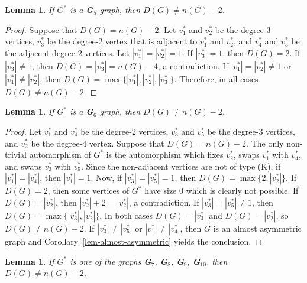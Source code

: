 \documentclass[12pt]{article}
\newtheorem{lemma}[theorem]{Lemma}
\begin{document}
\begin{lemma}\label{G5}
If $G^{\ast}$ is a {\bf G}$_5$ graph, 
then $D(G)\neq n(G)-2$.
\end{lemma}

\begin{proof}
Suppose that $D(G)= n(G)-2$.
Let $v^{\ast}_1$ and $v^{\ast}_2$ be the degree-$3$ vertices, $v^{\ast}_3$ 
be the degree-$2$ vertex that is adjacent to $v^{\ast}_1$ and $v^{\ast}_2$, 
and $v^{\ast}_4$ and $v^{\ast}_5$ be the adjacent degree-$2$ vertices. Let $|v^{\ast}_1|=|v^{\ast}_2|=1$. 
If $|v^{\ast}_3|=1$, then $D(G)= 2$. 
If $|v^{\ast}_3|\neq 1$, then $D(G)= |v^{\ast}_3|=n(G)-4$, a contradiction. If $|v^{\ast}_1|=|v^{\ast}_2|\neq 1$ or $|v^{\ast}_1|\neq |v^{\ast}_2|$, 
then $D(G)=\max \{|v^{\ast}_1|, |v^{\ast}_2|, |v^{\ast}_3|\}$. 
Therefore, in all cases $D(G)\neq n(G)-2$.
\end{proof}

\begin{lemma}\label{G6}
If $G^{\ast}$ is a {\bf G}$_6$ graph, then $D(G)\neq n(G)-2$.  
\end{lemma}
\begin{proof}
Let $v^{\ast}_1$ and $v^{\ast}_4$ be the degree-$2$ vertices, 
$v^{\ast}_3$ and $v^{\ast}_5$ be the degree-$3$ vertices, and $v^{\ast}_2$ 
be the degree-$4$ vertex. 
Suppose that $D(G)= n(G)-2$. 
The only non-trivial automorphism of $G^{\ast}$ is the automorphism which fixes $v^{\ast}_2$, swaps $v^{\ast}_1$ with $v^{\ast}_4$, and swaps $v^{\ast}_3$ with $v^{\ast}_5$.
Since the non-adjacent vertices are not of type (K), if $|v^{\ast}_1|=|v^{\ast}_4|$, then $|v^{\ast}_1|=1$. 
Now, if $|v^{\ast}_3|=|v^{\ast}_5|=1$, then $D(G)=\max \{2, |v^{\ast}_2|\}$. 
If $D(G)=2$, then some vertices of $G^{\ast}$ have size $0$ which is clearly not possible. If $D(G)=|v^{\ast}_2|$, then $|v^{\ast}_2|+2=|v^{\ast}_2|$, a contradiction. 
If $|v^{\ast}_3|=|v^{\ast}_5|\neq 1$, then $D(G)=\max \{|v^{\ast}_3|, |v^{\ast}_2|\}$. In both cases $D(G)= |v^{\ast}_3|$ and $D(G)=|v^{\ast}_2|$, so$D(G)\neq n(G)-2$. If $|v^{\ast}_3|\neq |v^{\ast}_5|$ or $|v^{\ast}_1| \neq |v^{\ast}_4|$, then $G$ is an almost asymmetric graph and Corollary~\ref{lem-almost-asymmetric} yields the conclusion. 
\end{proof}

\begin{lemma} \label{Gal}
If $G^{\ast}$ is one of the graphs {\bf G}$_7$, {\bf G}$_8$, {\bf G}$_9$, {\bf G}$_{10}$, then $D(G)\neq n(G)-2$.
\end{lemma}
\end{document}
